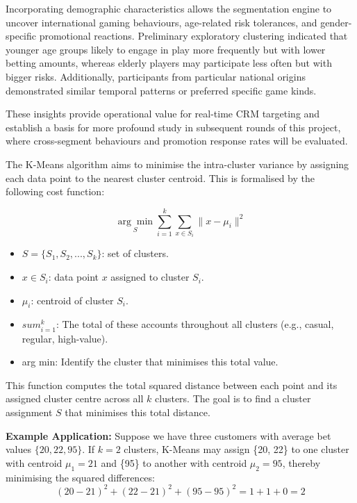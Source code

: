 \documentclass[12pt,a4paper]{report}
\begin{document}
 Incorporating demographic characteristics allows the segmentation engine to uncover international gaming behaviours, age-related risk tolerances, and gender-specific promotional reactions.  Preliminary exploratory clustering indicated that younger age groups likely to engage in play more frequently but with lower betting amounts, whereas elderly players may participate less often but with bigger risks.  Additionally, participants from particular national origins demonstrated similar temporal patterns or preferred specific game kinds.

 These insights provide operational value for real-time CRM targeting and establish a basis for more profound study in subsequent rounds of this project, where cross-segment behaviours and promotion response rates will be evaluated.

The K-Means algorithm aims to minimise the intra-cluster variance by assigning each data point to the nearest cluster centroid. This is formalised by the following cost function:

\begin{equation}
\underset{S}{\arg\min} \sum_{i=1}^{k} \sum_{x \in S_i} \| x - \mu_i \|^2
\end{equation}

\begin{itemize}
    \item \( S = \{S_1, S_2, ..., S_k\} \): set of clusters.
    \item \( x \in S_i \): data point \(x\) assigned to cluster \(S_i\).
    \item \( \mu_i \): centroid of cluster \(S_i\).
    \item \(sum_{i=1}^{k}\): The total of these accounts throughout all clusters (e.g., casual, regular, high-value).
    \item arg min: Identify the cluster that minimises this total value. 
\end{itemize}

This function computes the total squared distance between each point and its assigned cluster centre across all \(k\) clusters. The goal is to find a cluster assignment \(S\) that minimises this total distance.

\vspace{0.5em}
\textbf{Example Application:} Suppose we have three customers with average bet values \(\{20, 22, 95\}\). If \(k = 2\) clusters, K-Means may assign \{20, 22\} to one cluster with centroid \(\mu_1 = 21\) and \{95\} to another with centroid \(\mu_2 = 95\), thereby minimising the squared differences:
\[
(20 - 21)^2 + (22 - 21)^2 + (95 - 95)^2 = 1 + 1 + 0 = 2
\]
\end{document}
